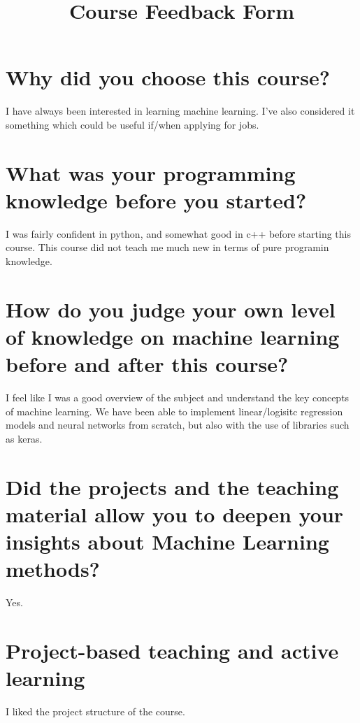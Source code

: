 \documentclass[12pt]{article}
\title{Course Feedback Form}
\author{}
\date{}
\begin{document}
\maketitle

\section*{Why did you choose this course?}
\noindent
I have always been interested in learning machine learning. I've also considered it something which could be useful if/when applying for jobs.

\vspace{2cm}

\section*{What was your programming knowledge before you started?}
I was fairly confident in python, and somewhat good in c++ before starting this course. This course did not teach me much new in terms of pure programin knowledge. 

\vspace{2cm}

\section*{How do you judge your own level of knowledge on machine learning before and after this course?}
I feel like I was a good overview of the subject and understand the key concepts of machine learning. We have been able to implement linear/logisitc regression models and neural networks from scratch, but also with the use of libraries such as keras. 

\vspace{2cm}

\section*{Did the projects and the teaching material allow you to deepen your insights about Machine Learning methods?}
Yes.

\vspace{2cm}

\section*{Project-based teaching and active learning}
\noindent
I liked the project structure of the course.
\end{document}
